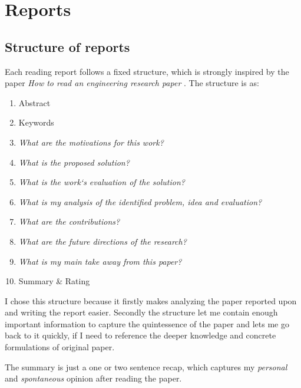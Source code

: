 


    \chapter{Reports}

    \section*{Structure of reports}

    Each reading report follows a fixed structure, which is strongly inspired by the paper \emph{How to read an engineering research paper} \cite{Griswold2009}.
    The structure is as: \ \begin{enumerate}
        \item Abstract
        \item Keywords
        \item \emph{What are the motivations for this work?}
        \item \emph{What is the proposed solution?}
        \item \emph{What is the work‘s evaluation of the solution?}
        \item \emph{What is my analysis of the identified problem, idea and evaluation?}
        \item \emph{What are the contributions?}
        \item \emph{What are the future directions of the research?}
        \item \emph{What is my main take away from this paper?}
        \item Summary \& Rating
    \end{enumerate}

    I chose this structure because it firstly makes analyzing the paper reported upon and writing the report easier. Secondly the structure let me contain enough important information to capture the quintessence of the paper and lets me go back to it quickly, if I need to reference the deeper knowledge and concrete formulations of original paper.

    The summary is just a one or two sentence recap, which captures my \emph{personal} and \emph{spontaneous} opinion after reading the paper. 
    


